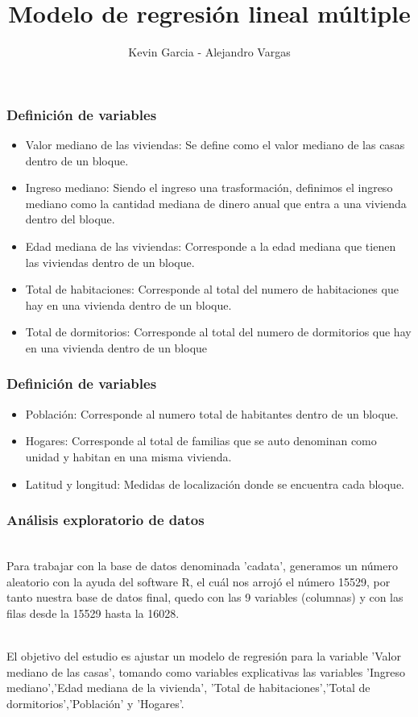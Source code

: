 \documentclass[12pt]{beamer}
\author{Kevin Garcia - Alejandro Vargas}
\title{Modelo de regresión lineal múltiple}
\begin{document}
\begin{frame}
\titlepage
\end{frame}

\begin{frame}
\frametitle{Definición de variables}
\begin{itemize}
\item Valor mediano de las viviendas: Se define como el valor mediano de las casas dentro de un bloque.
\item Ingreso mediano: Siendo el ingreso una trasformación, definimos el ingreso mediano como la cantidad mediana de dinero anual que entra a una vivienda dentro del bloque.
\item Edad mediana de las viviendas: Corresponde a la edad mediana que tienen las viviendas dentro de un bloque.
\item Total de habitaciones: Corresponde al total del numero de habitaciones que hay en una vivienda dentro de un bloque.
\item Total de dormitorios: Corresponde al total del numero de dormitorios que hay en una vivienda dentro de un bloque
\end{itemize}
\end{frame}
\begin{frame}
\frametitle{Definición de variables}
\begin{itemize}
\item Población: Corresponde al numero total de habitantes dentro de un bloque.
\item Hogares: Corresponde al total de familias que se auto denominan como unidad y habitan en una misma vivienda.
\item Latitud y longitud: Medidas de localización donde se encuentra cada bloque.
\end{itemize}
\end{frame}

\begin{frame}
\frametitle{Análisis exploratorio de datos}
~\\ Para trabajar con la base de datos denominada 'cadata', generamos un número aleatorio con la ayuda del software R, el cuál nos arrojó el número 15529, por tanto nuestra base de datos final, quedo con las 9 variables (columnas) y con las filas desde la 15529 hasta la 16028.

~\\ El objetivo del estudio es ajustar un modelo de regresión para la variable 'Valor mediano de las casas', tomando como variables explicativas las variables 'Ingreso mediano','Edad mediana de la vivienda', 'Total de habitaciones','Total de dormitorios','Población' y 'Hogares'. 
\end{frame}
\end{document}
